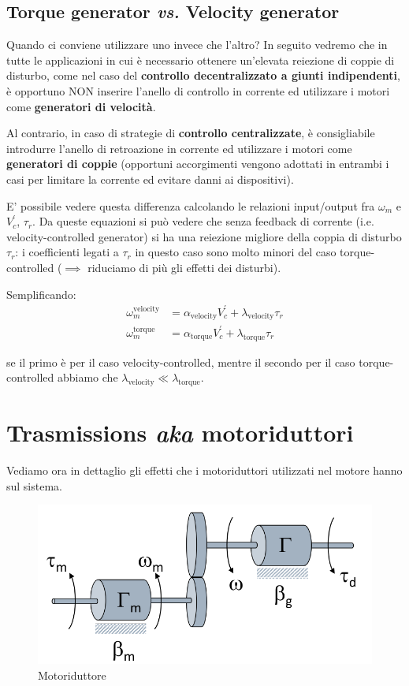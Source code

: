 \subsection{Torque generator \textit{vs.} Velocity generator}


Quando ci conviene utilizzare uno invece che l'altro?
In seguito vedremo che in tutte le applicazioni in cui è necessario ottenere un’elevata reiezione di coppie di disturbo, come nel caso del \textbf{controllo decentralizzato a giunti indipendenti}, è opportuno NON inserire l’anello di controllo in corrente ed utilizzare i motori come \textbf{generatori di velocità}.

Al contrario, in caso di strategie di \textbf{controllo centralizzate}, è consigliabile introdurre l’anello di retroazione in corrente ed utilizzare i motori come \textbf{generatori di coppie} (opportuni accorgimenti vengono adottati in entrambi i casi per limitare la corrente ed evitare danni ai dispositivi).

E' possibile vedere questa differenza calcolando le relazioni input/output fra $\omega_m$ e $V^{'}_c$, $\tau_r$. Da queste equazioni si può vedere che senza feedback di corrente (i.e. velocity-controlled generator) si ha una reiezione migliore della coppia di disturbo $\tau_r$: i coefficienti legati a $\tau_r$ in questo caso sono molto minori del caso torque-controlled ($\implies$ riduciamo di più gli effetti dei disturbi).

Semplificando:
\begin{align}
\omega_m^{\text{velocity}} &= \alpha_{\text{velocity}} V^{'}_c + \lambda_{\text{velocity}}\tau_r \\
\omega_m^{\text{torque}} &= \alpha_{\text{torque}} V^{'}_c + \lambda_{\text{torque}}\tau_r
\end{align}

se il primo è per il caso velocity-controlled, mentre il secondo per il caso torque-controlled abbiamo che $\lambda_{\text{velocity}} \ll \lambda_{\text{torque}}$.







\section{Trasmissions {\small \textit{aka}} motoriduttori}
Vediamo ora in dettaglio gli effetti che i motoriduttori utilizzati nel motore hanno sul sistema.

\begin{figure}[th!]
	\centering
	\includegraphics[width=0.5\linewidth]{images/trasmission_1}
	\caption{Motoriduttore}
	\label{fig:trasmission1}
\end{figure}


